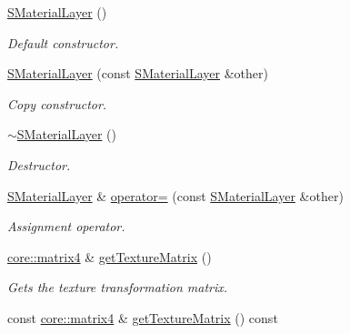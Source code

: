 \begin{DoxyCompactItemize}
\item 
\mbox{\label{classirr_1_1video_1_1SMaterialLayer_aa33412579ecf68093eec0926cfddfcda}} 
\hyperlink{classirr_1_1video_1_1SMaterialLayer_aa33412579ecf68093eec0926cfddfcda}{S\+Material\+Layer} ()
\begin{DoxyCompactList}\small\item\em Default constructor. \end{DoxyCompactList}\item 
\hyperlink{classirr_1_1video_1_1SMaterialLayer_afb8b8d94178e389f8afa1e6190a35f9d}{S\+Material\+Layer} (const \hyperlink{classirr_1_1video_1_1SMaterialLayer}{S\+Material\+Layer} \&other)
\begin{DoxyCompactList}\small\item\em Copy constructor. \end{DoxyCompactList}\item 
\mbox{\label{classirr_1_1video_1_1SMaterialLayer_a3a95dd1993dcc1f2d4bf873602b49b4e}} 
\hyperlink{classirr_1_1video_1_1SMaterialLayer_a3a95dd1993dcc1f2d4bf873602b49b4e}{$\sim$\+S\+Material\+Layer} ()
\begin{DoxyCompactList}\small\item\em Destructor. \end{DoxyCompactList}\item 
\hyperlink{classirr_1_1video_1_1SMaterialLayer}{S\+Material\+Layer} \& \hyperlink{classirr_1_1video_1_1SMaterialLayer_a94f5f3af3cd4ded545779e1942c63734}{operator=} (const \hyperlink{classirr_1_1video_1_1SMaterialLayer}{S\+Material\+Layer} \&other)
\begin{DoxyCompactList}\small\item\em Assignment operator. \end{DoxyCompactList}\item 
\hyperlink{namespaceirr_1_1core_a4c9d4e29899535971052810954a14431}{core\+::matrix4} \& \hyperlink{classirr_1_1video_1_1SMaterialLayer_aa8d7c025f5bb282537b8886c340dbe63}{get\+Texture\+Matrix} ()
\begin{DoxyCompactList}\small\item\em Gets the texture transformation matrix. \end{DoxyCompactList}\item 
const \hyperlink{namespaceirr_1_1core_a4c9d4e29899535971052810954a14431}{core\+::matrix4} \& \hyperlink{classirr_1_1video_1_1SMaterialLayer_a81072348510d63fcc11134ae7471c5f7}{get\+Texture\+Matrix} () const

\end{DoxyCompactItemize}
